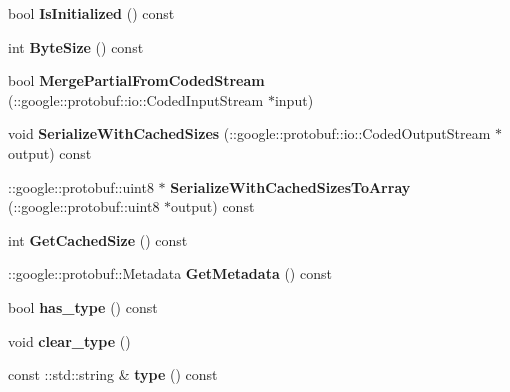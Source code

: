 \begin{DoxyCompactItemize}
bool {\bfseries Is\+Initialized} () const
\item 
\mbox{\label{classcaffe_1_1_filler_parameter_ab37c78d2b114bd36863388ba40103b55}} 
int {\bfseries Byte\+Size} () const
\item 
\mbox{\label{classcaffe_1_1_filler_parameter_aeb6ee96d3e880e7325ebf0c0147b42d4}} 
bool {\bfseries Merge\+Partial\+From\+Coded\+Stream} (\+::google\+::protobuf\+::io\+::\+Coded\+Input\+Stream $\ast$input)
\item 
\mbox{\label{classcaffe_1_1_filler_parameter_a6088e584c41faedfaf2d8ed95423b5b1}} 
void {\bfseries Serialize\+With\+Cached\+Sizes} (\+::google\+::protobuf\+::io\+::\+Coded\+Output\+Stream $\ast$output) const
\item 
\mbox{\label{classcaffe_1_1_filler_parameter_a17de43647973a5c4363969a74981b63b}} 
\+::google\+::protobuf\+::uint8 $\ast$ {\bfseries Serialize\+With\+Cached\+Sizes\+To\+Array} (\+::google\+::protobuf\+::uint8 $\ast$output) const
\item 
\mbox{\label{classcaffe_1_1_filler_parameter_a27645c4a7291fd3236f8bf7bee76c28f}} 
int {\bfseries Get\+Cached\+Size} () const
\item 
\mbox{\label{classcaffe_1_1_filler_parameter_acb2981b5f47339e0669f58c61744af4d}} 
\+::google\+::protobuf\+::\+Metadata {\bfseries Get\+Metadata} () const
\item 
\mbox{\label{classcaffe_1_1_filler_parameter_a3565979b490fe914189ba10ad9dd1a5b}} 
bool {\bfseries has\+\_\+type} () const
\item 
\mbox{\label{classcaffe_1_1_filler_parameter_af24e8649ea347a3328902ababad7e47f}} 
void {\bfseries clear\+\_\+type} ()
\item 
\mbox{\label{classcaffe_1_1_filler_parameter_ae0d216aa0fd7783a8fac436beb1516af}} 
const \+::std\+::string \& {\bfseries type} () const
\item 

\end{DoxyCompactItemize}
